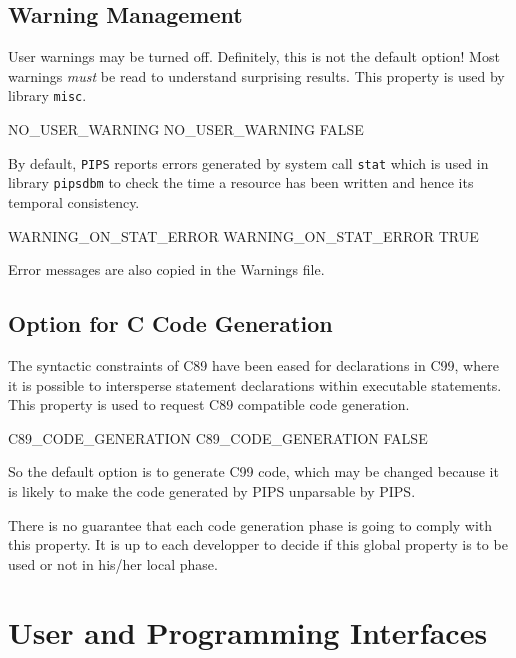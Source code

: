 \documentclass[a4paper]{report}
\begin{document}
\subsection{Warning Management}

User warnings may be turned off. Definitely, this is not the default
option! Most warnings {\em must} be read to understand surprising results.
This property is used by library \verb/misc/.

\begin{PipsProp}{NO_USER_WARNING}
NO_USER_WARNING FALSE
\end{PipsProp}

By default, {\tt PIPS} reports errors generated by system call \verb/stat/
which is used in library \verb/pipsdbm/ to check the time a resource has
been written and hence its temporal consistency.

\begin{PipsProp}{WARNING_ON_STAT_ERROR}
WARNING_ON_STAT_ERROR TRUE
\end{PipsProp}

Error messages are also copied in the Warnings file.

\subsection{Option for C Code Generation}

The syntactic constraints of C89 have been eased for declarations in
C99, where it is possible to intersperse statement declarations within
executable statements. This property is used to request C89 compatible
code generation.

\begin{PipsProp}{C89_CODE_GENERATION}
C89_CODE_GENERATION FALSE
\end{PipsProp}

So the default option is to generate C99 code, which may be changed
because it is likely to make the code generated by PIPS unparsable by PIPS.

There is no guarantee that each code generation phase is going to
comply with this property. It is up to each developper to decide if
this global property is to be used or not in his/her local phase.

\section{User and Programming Interfaces}
\end{document}
